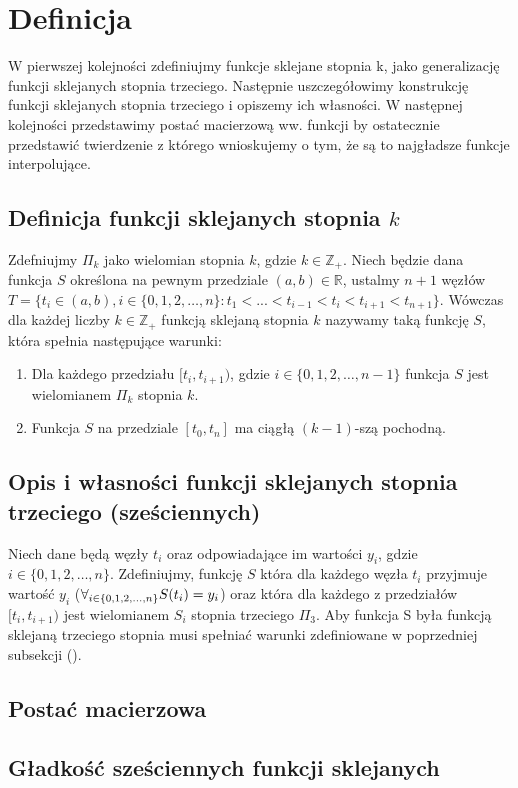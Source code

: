 \section{Definicja}
\label{sekcja2:definicja}
W pierwszej kolejności zdefiniujmy funkcje sklejane stopnia k, jako
 generalizację funkcji sklejanych stopnia trzeciego. 
 Następnie uszczegółowimy konstrukcję funkcji sklejanych stopnia
  trzeciego i opiszemy ich własności. 
  W następnej kolejności przedstawimy postać macierzową 
  ww. funkcji by ostatecznie przedstawić twierdzenie z 
  którego wnioskujemy o tym, że są to najgładsze funkcje interpolujące.

\subsection{Definicja funkcji sklejanych stopnia $k$}
\label{subsekcja2:definicja}
Zdefniujmy $\Pi_k$ jako wielomian stopnia $k$, gdzie $k \in \mathbb{Z_+}$.
Niech będzie dana funkcja $S$ określona na pewnym 
przedziale $(a,b)\in\mathbb{R}$, ustalmy $n+1$ węzłów $T = \{t_i \in (a,b), i \in \{0, 1, 2, \dots, n\}: t_1 < ... < t_{i-1} < t_{i} < t_{i+1} < t_{n+1}\}$.
Wówczas dla każdej liczby $k \in \mathbb{Z_+}$ funkcją sklejaną 
stopnia $k$ nazywamy taką funkcję $S$, która spełnia 
następujące warunki:
\begin{enumerate}
    \item Dla każdego przedziału $[t_i, t_{i+1})$, gdzie $i \in \{0, 1, 2, \dots, n-1\}$ funkcja $S$ jest wielomianem $\Pi_k$ stopnia $k$.
    \item Funkcja $S$ na przedziale $[t_0, t_n]$ ma ciągłą $(k-1)$-szą pochodną.
\end{enumerate}

\subsection{Opis i własności funkcji sklejanych stopnia trzeciego (sześciennych)}
\label{subsekcja2:opis_i_wlasnosci_fss3}
Niech dane będą węzły $t_i$ oraz odpowiadające im 
wartości $y_i$, gdzie $i \in \{0, 1, 2, \dots, n\}$. 
Zdefiniujmy, funkcję $S$ która dla każdego węzła $t_i$ przyjmuje 
wartość $y_i$ \big($\forall_{i\in\{0,1,2,\dots,n\}} \space S(t_i) = y_i$\big)
oraz która dla każdego z przedziałów $[t_i, t_{i+1})$ jest wielomianem $S_i$ stopnia trzeciego $\Pi_3$.
Aby funkcja S była funkcją sklejaną trzeciego stopnia musi spełniać warunki zdefiniowane w poprzedniej subsekcji ().


\subsection{Postać macierzowa}
\label{subsekcja2:postac_macierzowa}
\subsection{Gładkość sześciennych funkcji sklejanych}
\label{subsekcja2:gladkosc}
